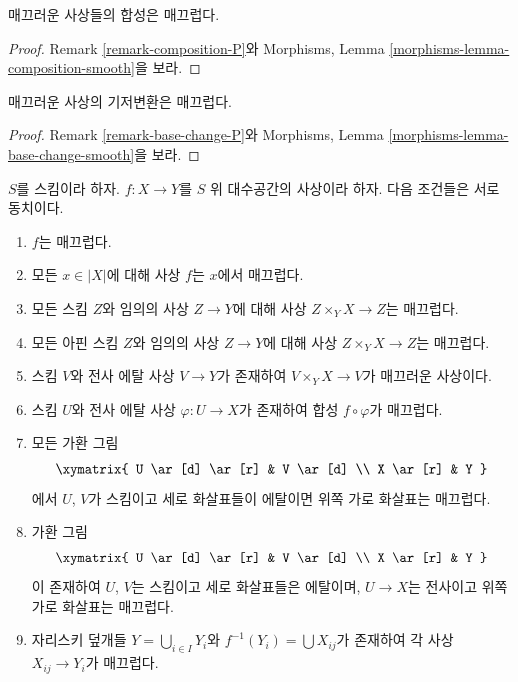 \begin{lemma}
\label{lemma-composition-smooth}
매끄러운 사상들의 합성은 매끄럽다.
\end{lemma}

\begin{proof}
Remark \ref{remark-composition-P}와 Morphisms, Lemma
\ref{morphisms-lemma-composition-smooth}을 보라.
\end{proof}

\begin{lemma}
\label{lemma-base-change-smooth}
매끄러운 사상의 기저변환은 매끄럽다.
\end{lemma}

\begin{proof}
Remark \ref{remark-base-change-P}와 Morphisms, Lemma
\ref{morphisms-lemma-base-change-smooth}을 보라.
\end{proof}

\begin{lemma}
\label{lemma-smooth-local}
$S$를 스킴이라 하자.
$f : X \to Y$를 $S$ 위 대수공간의 사상이라 하자.
다음 조건들은 서로 동치이다.
\begin{enumerate}
\item $f$는 매끄럽다.
\item 모든 $x \in |X|$에 대해 사상 $f$는 $x$에서 매끄럽다.
\item 모든 스킴 $Z$와 임의의 사상 $Z \to Y$에 대해 사상
$Z \times_Y X \to Z$는 매끄럽다.
\item 모든 아핀 스킴 $Z$와 임의의 사상 $Z \to Y$에 대해 사상
$Z \times_Y X \to Z$는 매끄럽다.
\item 스킴 $V$와 전사 에탈 사상 $V \to Y$가 존재하여
$V \times_Y X \to V$가 매끄러운 사상이다.
\item 스킴 $U$와 전사 에탈 사상 $\varphi : U \to X$가 존재하여
합성 $f \circ \varphi$가 매끄럽다.
\item 모든 가환 그림
$$
\xymatrix{
U \ar[d] \ar[r] & V \ar[d] \\
X \ar[r] & Y
}
$$
에서 $U$, $V$가 스킴이고 세로 화살표들이 에탈이면 위쪽 가로
화살표는 매끄럽다.
\item 가환 그림
$$
\xymatrix{
U \ar[d] \ar[r] & V \ar[d] \\
X \ar[r] & Y
}
$$
이 존재하여 $U$, $V$는 스킴이고 세로 화살표들은 에탈이며,
$U \to X$는 전사이고 위쪽 가로 화살표는 매끄럽다.
\item 자리스키 덮개들 $Y = \bigcup_{i \in I} Y_i$와
$f^{-1}(Y_i) = \bigcup X_{ij}$가 존재하여 각 사상
$X_{ij} \to Y_i$가 매끄럽다.
\end{enumerate}
\end{lemma}

